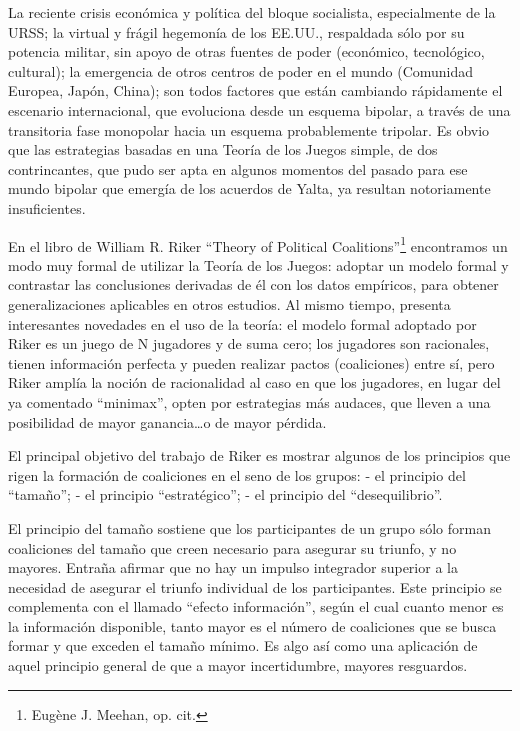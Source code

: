 \documentclass[
]{book}
\begin{document}
La reciente crisis económica y política del bloque socialista, especialmente de la URSS; la virtual y frágil hegemonía de los EE.UU., respaldada sólo por su potencia militar, sin apoyo de otras fuentes de poder (económico, tecnológico, cultural); la emergencia de otros centros de poder en el mundo (Comunidad Europea, Japón, China); son todos factores que están cambiando rápidamente el escenario internacional, que evoluciona desde un esquema bipolar, a través de una transitoria fase monopolar hacia un esquema probablemente tripolar. Es obvio que las estrategias basadas en una Teoría de los Juegos simple, de dos contrincantes, que pudo ser apta en algunos momentos del pasado para ese mundo bipolar que emergía de los acuerdos de Yalta, ya resultan notoriamente insuficientes.

En el libro de William R. Riker ``Theory of Political Coalitions''\footnote{Eugène J. Meehan, op. cit.} encontramos un modo muy formal de utilizar la Teoría de los Juegos: adoptar un modelo formal y contrastar las conclusiones derivadas de él con los datos empíricos, para obtener generalizaciones aplicables en otros estudios. Al mismo tiempo, presenta interesantes novedades en el uso de la teoría: el modelo formal adoptado por Riker es un juego de N jugadores y de suma cero; los jugadores son racionales, tienen información perfecta y pueden realizar pactos (coaliciones) entre sí, pero Riker amplía la noción de racionalidad al caso en que los jugadores, en lugar del ya comentado ``minimax'', opten por estrategias más audaces, que lleven a una posibilidad de mayor ganancia\ldots o de mayor pérdida.

El principal objetivo del trabajo de Riker es mostrar algunos de los principios que rigen la formación de coaliciones en el seno de los grupos: - el principio del ``tamaño''; - el principio ``estratégico''; - el principio del ``desequilibrio''.

El principio del tamaño sostiene que los participantes de un grupo sólo forman coaliciones del tamaño que creen necesario para asegurar su triunfo, y no mayores. Entraña afirmar que no hay un impulso integrador superior a la necesidad de asegurar el triunfo individual de los participantes. Este principio se complementa con el llamado ``efecto información'', según el cual cuanto menor es la información disponible, tanto mayor es el número de coaliciones que se busca formar y que exceden el tamaño mínimo. Es algo así como una aplicación de aquel principio general de que a mayor incertidumbre, mayores resguardos.
\end{document}
